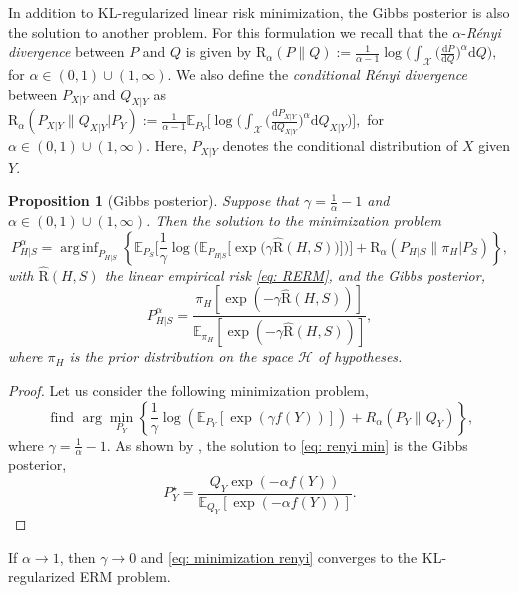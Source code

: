 \documentclass{article}
\theoremstyle{plain}
\theoremstyle{plain}
\newtheorem{proposition}[theorem]{Proposition}
\theoremstyle{definition}
\theoremstyle{remark}
\newcommand{\mrd}{\mathrm{d}}
\newcommand{\mbE}{\mathbb{E}}
\begin{document}
In addition to KL-regularized linear risk minimization, the Gibbs posterior is also the solution to  another problem. For this formulation we recall that  the $\alpha$-{\it R\'enyi divergence} between $P$ and $Q$ is given by $\mathrm{R}_{\alpha}(P\|Q):=\frac{1}{\alpha-1}\log\Big(\int_\mathcal{X} \Big(\frac{\mrd P}{\mrd Q}\Big)^{\alpha}\mrd Q\Big),$ for $\alpha\in(0,1)\cup(1,\infty)$. We also define the {\it conditional R\'enyi divergence}  between $P_{X|Y}$ and $Q_{X|Y}$ as $\mathrm{R}_{\alpha}(P_{X|Y}\|Q_{X|Y}|P_Y):=\frac{1}{\alpha-1}\mathbb{E}_{P_Y}\Big[\log\Big(\int_\mathcal{X} \Big(\frac{\mrd P_{X|Y}}{\mrd Q_{X|Y}}\Big)^{\alpha}\mrd Q_{X|Y}\Big)\Big],$ for $\alpha\in(0,1)\cup(1,\infty)$. 
Here, $P_{X|Y} $ denotes the conditional distribution of $X$ given $Y$.
\begin{proposition}[Gibbs posterior]\label{prop: gibbs algorithm} Suppose that $\gamma=\frac{1}{\alpha}-1$ and $\alpha\in(0,1)\cup(1,\infty)$. Then the solution to the %
minimization problem 
\begin{equation}\label{eq: minimization renyi}
    P_{H|S}^{\alpha}=\mathop{\mathrm{arg}\, \inf}_{P_{H|S}} \left\{ \mbE_{P_S}\Big[\frac{1}{\gamma}\log\Big(\mbE_{P_{H|S}}\Big[\exp\Big(\gamma \hat{\mathrm{R}}(H,S)\Big)\Big]\Big) \Big] + \mathrm{R}_{\alpha}(P_{H|S}\|\pi_H|P_S) \right\} ,
\end{equation}
with $\hat{\mathrm{R}}(H,S)$ the linear empirical risk \eqref{eq: RERM}, %
and the Gibbs posterior,
    \[P_{H|S}^{\alpha}=\frac{\pi_H  [\exp(-\gamma \hat{\mathrm{R}}(H,S))]}{\mbE_{\pi_H }[\exp(-\gamma \hat{\mathrm{R}}(H,S))]},\] 
    where $\pi_H$ is the prior distribution on the space $\mathcal{H}$ of hypotheses.
    

\end{proposition}
\begin{proof}
    Let us consider the following minimization problem,
    \begin{equation}\label{eq: renyi min}
    \mbox{ find } \arg \min_{P_Y}  \left\{  \frac{1}{\gamma}\log(\mbE_{P_Y}[\exp(\gamma f(Y))]) + R_{\alpha}(P_{Y}\|Q_Y)  \right\} ,\end{equation} 
    where $\gamma=\frac{1}{\alpha}-1$. As shown by \citet{dvijotham2012unifying}, the solution to \eqref{eq: renyi min} is the Gibbs posterior,
    \[P_Y^{\star}=\frac{Q_Y \exp(-\alpha f(Y))}{\mbE_{Q_Y}[\exp(-\alpha f(Y))]}.\]
\end{proof}
If $\alpha\rightarrow 1$, then $\gamma\rightarrow 0$ and \eqref{eq: minimization renyi} converges to the KL-regularized ERM problem. %
\end{document}
